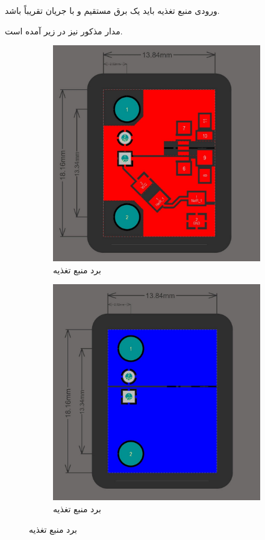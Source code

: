 \documentclass[a4paper,12pt]{report}
\begin{document}
		ورودی منبع تغذیه باید یک برق مستقیم
		و با جریان تقریباً
		باشد.

		مدار مذکور نیز در زیر آمده است.

		\begin{figure}[!h]
			\centering
			\begin{subfigure}{0.3\linewidth}
				\centering
				\includegraphics[width=0.7\linewidth]{resources/altium-power-supplay-top-layer.jpg}
				\caption{
				برد منبع تغذیه
				}
				\label{subfig1:fig1:subsubsec1:subsec2:sec3:chap2}
			\end{subfigure}
			\begin{subfigure}{0.3\linewidth}
				\centering
				\includegraphics[width=0.7\linewidth]{resources/altium-power-supplay-bottom-layer.jpg}
				\caption{
				برد منبع تغذیه
				}
				\label{subfig2:fig1:subsubsec1:subsec2:sec3:chap2}
			\end{subfigure}
			\caption{
			برد منبع تغذیه}
			\label{fig1:subsubsec1:subsec2:sec3:chap2}
		\end{figure}
\end{document}

